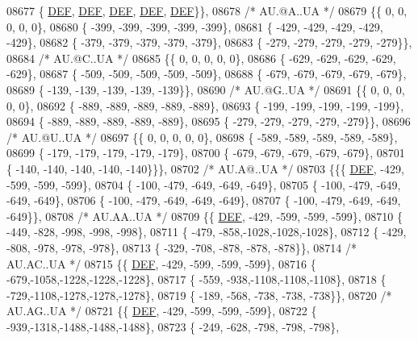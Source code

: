 \begin{DoxyCode}
08677 \{  \mbox{\hyperlink{1_88_84__epars_8h_a397419fc12b37ed479c8abb9d444d843}{DEF}},  \mbox{\hyperlink{1_88_84__epars_8h_a397419fc12b37ed479c8abb9d444d843}{DEF}},  \mbox{\hyperlink{1_88_84__epars_8h_a397419fc12b37ed479c8abb9d444d843}{DEF}},  \mbox{\hyperlink{1_88_84__epars_8h_a397419fc12b37ed479c8abb9d444d843}{DEF}},  \mbox{\hyperlink{1_88_84__epars_8h_a397419fc12b37ed479c8abb9d444d843}{DEF}}\}\},
08678 \textcolor{comment}{/* AU.@A..UA */}
08679 \{\{    0,    0,    0,    0,    0\},
08680 \{ -399, -399, -399, -399, -399\},
08681 \{ -429, -429, -429, -429, -429\},
08682 \{ -379, -379, -379, -379, -379\},
08683 \{ -279, -279, -279, -279, -279\}\},
08684 \textcolor{comment}{/* AU.@C..UA */}
08685 \{\{    0,    0,    0,    0,    0\},
08686 \{ -629, -629, -629, -629, -629\},
08687 \{ -509, -509, -509, -509, -509\},
08688 \{ -679, -679, -679, -679, -679\},
08689 \{ -139, -139, -139, -139, -139\}\},
08690 \textcolor{comment}{/* AU.@G..UA */}
08691 \{\{    0,    0,    0,    0,    0\},
08692 \{ -889, -889, -889, -889, -889\},
08693 \{ -199, -199, -199, -199, -199\},
08694 \{ -889, -889, -889, -889, -889\},
08695 \{ -279, -279, -279, -279, -279\}\},
08696 \textcolor{comment}{/* AU.@U..UA */}
08697 \{\{    0,    0,    0,    0,    0\},
08698 \{ -589, -589, -589, -589, -589\},
08699 \{ -179, -179, -179, -179, -179\},
08700 \{ -679, -679, -679, -679, -679\},
08701 \{ -140, -140, -140, -140, -140\}\}\},
08702 \textcolor{comment}{/* AU.A@..UA */}
08703 \{\{\{  \mbox{\hyperlink{1_88_84__epars_8h_a397419fc12b37ed479c8abb9d444d843}{DEF}}, -429, -599, -599, -599\},
08704 \{ -100, -479, -649, -649, -649\},
08705 \{ -100, -479, -649, -649, -649\},
08706 \{ -100, -479, -649, -649, -649\},
08707 \{ -100, -479, -649, -649, -649\}\},
08708 \textcolor{comment}{/* AU.AA..UA */}
08709 \{\{  \mbox{\hyperlink{1_88_84__epars_8h_a397419fc12b37ed479c8abb9d444d843}{DEF}}, -429, -599, -599, -599\},
08710 \{ -449, -828, -998, -998, -998\},
08711 \{ -479, -858,-1028,-1028,-1028\},
08712 \{ -429, -808, -978, -978, -978\},
08713 \{ -329, -708, -878, -878, -878\}\},
08714 \textcolor{comment}{/* AU.AC..UA */}
08715 \{\{  \mbox{\hyperlink{1_88_84__epars_8h_a397419fc12b37ed479c8abb9d444d843}{DEF}}, -429, -599, -599, -599\},
08716 \{ -679,-1058,-1228,-1228,-1228\},
08717 \{ -559, -938,-1108,-1108,-1108\},
08718 \{ -729,-1108,-1278,-1278,-1278\},
08719 \{ -189, -568, -738, -738, -738\}\},
08720 \textcolor{comment}{/* AU.AG..UA */}
08721 \{\{  \mbox{\hyperlink{1_88_84__epars_8h_a397419fc12b37ed479c8abb9d444d843}{DEF}}, -429, -599, -599, -599\},
08722 \{ -939,-1318,-1488,-1488,-1488\},
08723 \{ -249, -628, -798, -798, -798\},

\end{DoxyCode}
